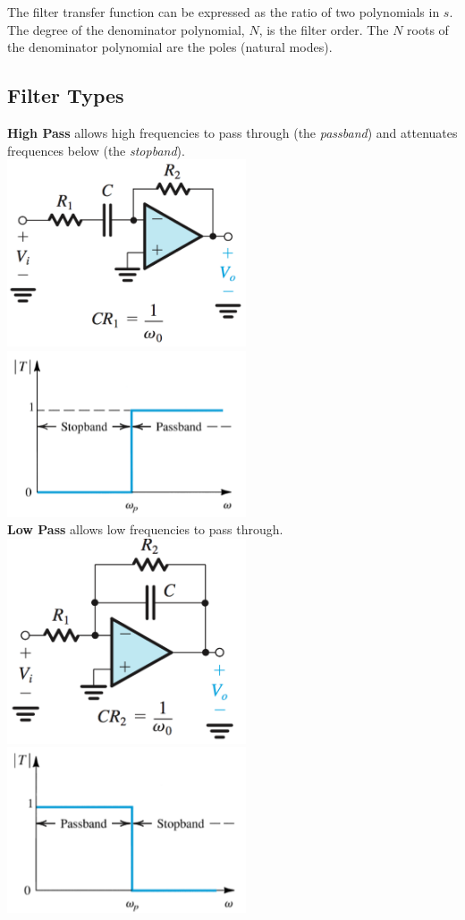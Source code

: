\documentclass[11pt]{article}
\begin{document}
    The filter transfer function can be expressed as the ratio of two polynomials in $s$. The degree of the denominator polynomial, $N$, is the filter order. The $N$ roots of the denominator polynomial are the poles (natural modes).

    \subsection{Filter Types}
    \textbf{High Pass} allows high frequencies to pass through (the \textit{passband}) and attenuates frequences below (the \textit{stopband}). \\

    \includegraphics[width=200pt]{highpass} \includegraphics[width=200pt]{highpass2}
    \\
    
    \textbf{Low Pass} allows low frequencies to pass through. \\

    \includegraphics[width=200pt]{lowpass} \includegraphics[width=200pt]{lowpass2} 
    
\end{document}
